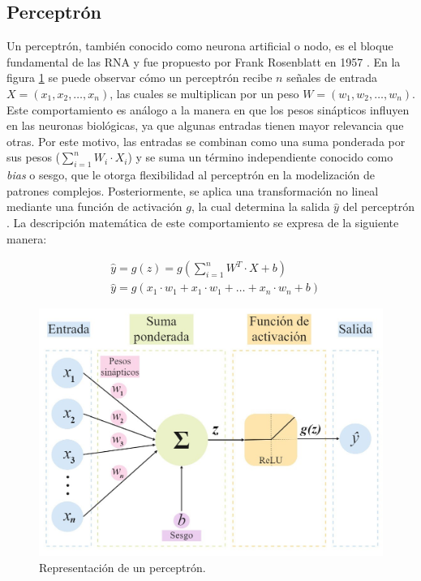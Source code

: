 \subsection{Perceptrón}
Un perceptrón, también conocido como neurona artificial o nodo, es el bloque fundamental de las 
RNA y fue propuesto por Frank Rosenblatt en 1957 \citep{CITE:43}. En la figura \ref{fig:Perceptron} se puede observar 
cómo un perceptrón recibe $n$ señales de entrada $X = (x_1, x_2, …, x_n)$, las cuales se multiplican 
por un peso $W = (w_1, w_2, …, w_n)$. Este comportamiento es análogo a la manera en que los 
pesos sinápticos influyen en las neuronas biológicas, ya que algunas entradas tienen mayor relevancia 
que otras. Por este motivo, las entradas se combinan como una suma ponderada por sus pesos 
($\sum_{i=1}^{n} W_i \cdot X_i$) y se suma un término independiente conocido como \emph{bias} o 
sesgo, que le otorga flexibilidad al perceptrón en la modelización de patrones complejos. 
Posteriormente, se aplica una transformación no lineal mediante una función de activación $g$, 
la cual determina la salida $\hat{y} $ del perceptrón \citep{CITE:35} \citep{CITE:42}. 
La descripción matemática de este comportamiento se expresa de la siguiente manera: 

\begin{equation}\label{eq:perceptron}
\begin{split}
	&\hat{y} = g(z) = g( \sum_{i=1}^{n} W^T \cdot X + b) \\
				&\hat{y} = g(x_1 \cdot w_1 + x_1 \cdot w_1 + … + x_n \cdot w_n + b)
\end{split}
\end{equation}

\begin{figure}[h!]
	\centering
	\includegraphics[width=\textwidth]{./Figures/Perceptron.jpg}
	\caption{Representación de un perceptrón.}
	\label{fig:Perceptron}
\end{figure}


